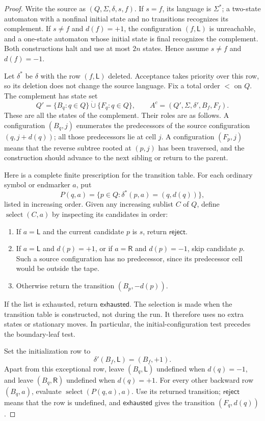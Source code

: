 \documentclass[11pt,a4paper]{article}
\theoremstyle{definition}
\theoremstyle{remark}
\newcommand{\LL}{\mathsf L}
\newcommand{\RR}{\mathsf R}
\begin{document}
\begin{proof}
Write the source as $(Q,\Sigma,\delta,s,f)$. If $s=f$, its language is
$\Sigma^*$; a two-state automaton with a nonfinal initial state and no
transitions recognizes its complement. If $s\ne f$ and $d(f)=+1$, the
configuration $(f,\LL)$ is unreachable, and a one-state automaton whose
initial state is final recognizes the complement. Both constructions halt and
use at most $2n$ states. Hence assume $s\ne f$ and $d(f)=-1$.

Let $\delta^*$ be $\delta$ with the row $(f,\LL)$ deleted. Acceptance takes
priority over this row, so its deletion does not change the source language.
Fix a total order $<$ on $Q$. The complement has state set
\[
  Q'=\{B_q:q\in Q\}\mathbin{\dot\cup}\{F_q:q\in Q\},
  \qquad A^c=(Q',\Sigma,\delta',B_f,F_f).
\]
These are all the states of the complement. Their roles are as follows. A configuration $(B_q,j)$
enumerates the predecessors of the source configuration $(q,j+d(q))$;
all those predecessors lie at cell $j$. A configuration $(F_p,j)$ means
that the reverse subtree rooted at $(p,j)$ has been traversed, and the
construction should advance to the next sibling or return to the parent.

Here is a complete finite prescription for the transition table. For each
ordinary symbol or endmarker $a$, put
\[
  P(q,a)=\{p\in Q:\delta^*(p,a)=(q,d(q))\},
\]
listed in increasing order. Given any increasing sublist $C$ of $Q$, define
$\operatorname{select}(C,a)$ by inspecting its candidates in order:
\begin{enumerate}
\item If $a=\LL$ and the current candidate $p$ is $s$, return
$\mathsf{reject}$.
\item If $a=\LL$ and $d(p)=+1$, or if $a=\RR$ and $d(p)=-1$,
skip candidate $p$. Such a source configuration has no predecessor, since
its predecessor cell would be outside the tape.
\item Otherwise return the transition $(B_p,-d(p))$.
\end{enumerate}
If the list is exhausted, return $\mathsf{exhausted}$. The selection is made when the transition table is constructed,
not during the run. It therefore uses no extra states or stationary
moves. In particular, the initial-configuration
test precedes the boundary-leaf test.

Set the initialization row to
\[
  \delta'(B_f,\LL)=(B_f,+1).
\]
Apart from this exceptional row, leave $(B_q,\LL)$ undefined when
$d(q)=-1$, and leave $(B_q,\RR)$ undefined when $d(q)=+1$.
For every other backward row $(B_q,a)$, evaluate
$\operatorname{select}(P(q,a),a)$. Use its returned transition;
$\mathsf{reject}$ means that the row is undefined, and
$\mathsf{exhausted}$ gives the transition $(F_q,d(q))$.


\end{proof}
\end{document}
